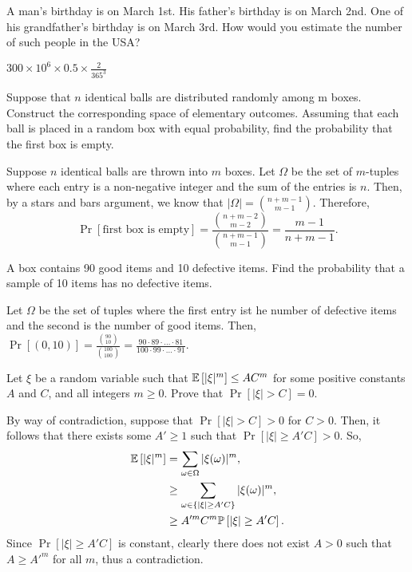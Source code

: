 \begin{problem}{1}
    A man’s birthday is on March 1st. His father’s birthday is on March 2nd. One of his grandfather’s birthday is on March 3rd. How would you estimate the number of such people in the USA?
\end{problem}
\begin{solution} 
    $300\times {10}^{6} \times 0.5 \times \frac{2}{365^3}$
\end{solution}
\begin{problem}{2}
    Suppose that $n$ identical balls are distributed randomly among m boxes. Construct the corresponding space of elementary outcomes. Assuming that each ball is placed in a random box with equal probability, find the probability that the first box is empty.
\end{problem}
\begin{solution}
    Suppose $n$ identical balls are thrown into $m$ boxes. Let $\Omega$ be the
    set of $m$-tuples where each entry is a non-negative integer and the sum of
    the entries is $n$. Then, by a stars and bars argument, we know that
    $|\Omega| = \binom{n+m-1}{m-1}$. Therefore, 
    \[
      \Pr\left[{\text{first box is empty}}\right] = \frac{\binom{n+m-2}{m-2}}{\binom{n+m-1}{m-1}} = \frac{m-1}{n+m-1}.
    \]
\end{solution}
\begin{problem}{3} 
    A box contains 90 good items and 10 defective items. Find the probability that a sample of 10 items has no defective items.
\end{problem}
\begin{solution}
    Let $\Omega$ be the set of tuples where the first entry ist he number of
    defective items and the second is the number of good items. Then,
    $\Pr\left[{(0,10)}\right] = \frac{\binom{90}{10}}{\binom{100}{100}} =
    \frac{90\cdot 89 \cdot \ldots \cdot 81}{100 \cdot 99 \cdot \ldots \cdot
    91}$.
\end{solution}
\begin{problem}{4}
    Let $\xi$ be a random variable such that $\mathbb{E}\left[|\xi|^m\right] \leq AC^m$ for some positive constants $A$ and $C$, and all integers $m\geq 0$. Prove that $\Pr[|\xi| > C] = 0$. 
\end{problem}
\begin{solution}
    By way of contradiction, suppose that $\Pr\left[{|\xi| > C}\right] > 0$ for
    $C > 0$. Then, it follows that there exists some $A' \geq 1$ such that
    $\Pr\left[{|\xi| \geq A'C}\right]> 0$. So, 
    \begin{align*}
        \mathbb{E}\left[|\xi|^m\right] &= \sum_{\omega \in \Omega} |\xi(\omega)|^m, \\
        &\geq \sum_{\omega \in \left\{ |\xi| \geq A'C \right\}} |\xi(\omega)|^m, \\
        &\geq A'^mC^m\mathbb{P}\left[{|\xi| \geq A'C}\right].
    \end{align*}
    Since $\Pr\left[{|\xi| \geq A'C}\right]$ is constant, clearly there does not
    exist $A > 0$ such that $A \geq A'^m$ for all $m$, thus a contradiction.
\end{solution}
